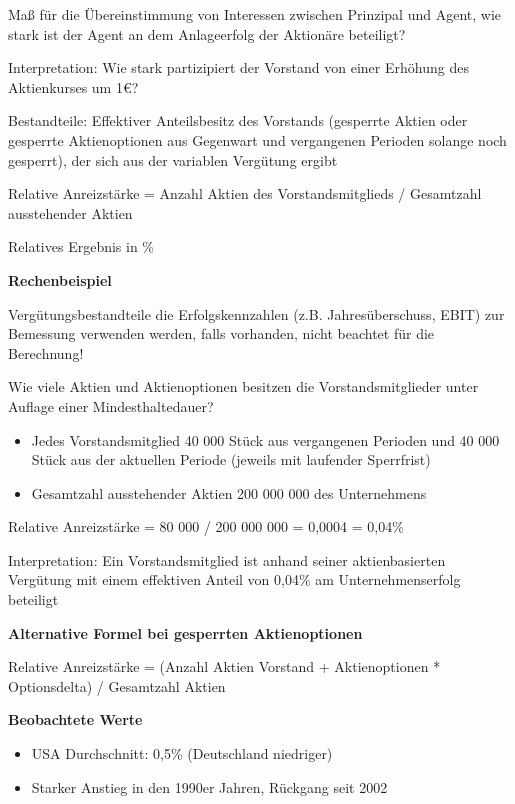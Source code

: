 \documentclass[
]{article}
\providecommand{\tightlist}{%
  \setlength{\itemsep}{0pt}\setlength{\parskip}{0pt}}
\begin{document}
Maß für die Übereinstimmung von Interessen zwischen Prinzipal und Agent,
wie stark ist der Agent an dem Anlageerfolg der Aktionäre beteiligt?

Interpretation: Wie stark partizipiert der Vorstand von einer Erhöhung
des Aktienkurses um 1€?

Bestandteile: Effektiver Anteilsbesitz des Vorstands (gesperrte Aktien
oder gesperrte Aktienoptionen aus Gegenwart und vergangenen Perioden
solange noch gesperrt), der sich aus der variablen Vergütung ergibt

Relative Anreizstärke = Anzahl Aktien des Vorstandsmitglieds /
Gesamtzahl ausstehender Aktien

Relatives Ergebnis in \%

\textbf{Rechenbeispiel}

Vergütungsbestandteile die Erfolgskennzahlen (z.B. Jahresüberschuss,
EBIT) zur Bemessung verwenden werden, falls vorhanden, nicht beachtet
für die Berechnung!

Wie viele Aktien und Aktienoptionen besitzen die Vorstandsmitglieder
unter Auflage einer Mindesthaltedauer?

\begin{itemize}
\tightlist
\item
  Jedes Vorstandsmitglied 40 000 Stück aus vergangenen Perioden und 40
  000 Stück aus der aktuellen Periode (jeweils mit laufender Sperrfrist)
\item
  Gesamtzahl ausstehender Aktien 200 000 000 des Unternehmens
\end{itemize}

Relative Anreizstärke = 80 000 / 200 000 000 = 0,0004 = 0,04\%

Interpretation: Ein Vorstandsmitglied ist anhand seiner aktienbasierten
Vergütung mit einem effektiven Anteil von 0,04\% am Unternehmenserfolg
beteiligt

\textbf{Alternative Formel bei gesperrten Aktienoptionen}

Relative Anreizstärke = (Anzahl Aktien Vorstand + Aktienoptionen *
Optionsdelta) / Gesamtzahl Aktien

\textbf{Beobachtete Werte}

\begin{itemize}
\tightlist
\item
  USA Durchschnitt: 0,5\% (Deutschland niedriger)
\item
  Starker Anstieg in den 1990er Jahren, Rückgang seit 2002
\end{itemize}
\end{document}
